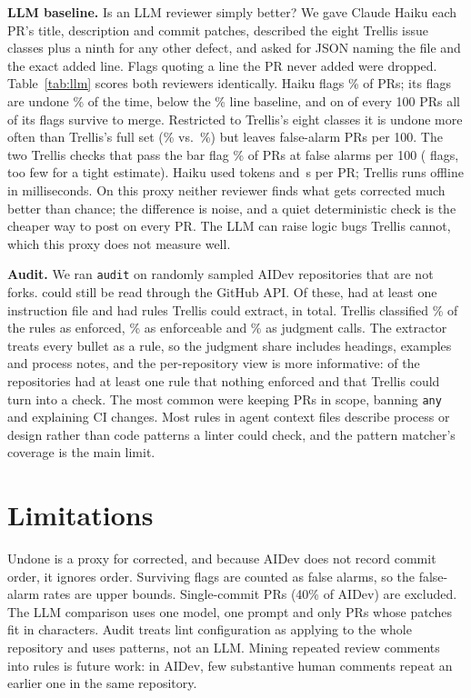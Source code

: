 \documentclass[sigconf]{acmart}
\begin{document}
\textbf{LLM baseline.} Is an LLM reviewer simply better? We gave Claude Haiku each PR's title, description and commit patches, described the eight Trellis issue classes plus a ninth for any other defect, and asked for JSON naming the file and the exact added line. Flags quoting a line the PR never added were dropped. Table~\ref{tab:llm} scores both reviewers identically. Haiku flags \lLlmAllPct\% of PRs; its flags are undone \lLlmAllUndone\% of the time, below the \lBase\% line baseline, and on \lLlmAllFa{} of every 100 PRs all of its flags survive to merge. Restricted to Trellis's eight classes it is undone more often than Trellis's full set (\lLlmSameUndone\% vs.\ \lTrAllUndone\%) but leaves \lLlmSameFa{} false-alarm PRs per 100. The two Trellis checks that pass the bar flag \lTrTwoPct\% of PRs at \lTrTwoFa{} false alarms per 100 (\lTrTwoN{} flags, too few for a tight estimate). Haiku used \lTokPerPR{} tokens and \lSec{}\,s per PR; Trellis runs offline in milliseconds. On this proxy neither reviewer finds what gets corrected much better than chance; the difference is noise, and a quiet deterministic check is the cheaper way to post on every PR. The LLM can raise logic bugs Trellis cannot, which this proxy does not measure well.

\textbf{Audit.} We ran \texttt{audit} on \aSampled{} randomly sampled AIDev repositories that are not forks. \aReachable{} could still be read through the GitHub API. Of these, \aWithInstructionFiles{} had at least one instruction file and \aWithRules{} had rules Trellis could extract, \aRules{} in total. Trellis classified \aEnforcedPct\% of the rules as enforced, \aEnforceablePct\% as enforceable and \aJudgmentPct\% as judgment calls. The extractor treats every bullet as a rule, so the judgment share includes headings, examples and process notes, and the per-repository view is more informative: \aReposWithUnenforcedCheckableRule{} of the \aWithRules{} repositories had at least one rule that nothing enforced and that Trellis could turn into a check. The most common were keeping PRs in scope, banning \texttt{any} and explaining CI changes. Most rules in agent context files describe process or design rather than code patterns a linter could check, and the pattern matcher's coverage is the main limit.

\section{Limitations}
Undone is a proxy for corrected, and because AIDev does not record commit order, it ignores order. Surviving flags are counted as false alarms, so the false-alarm rates are upper bounds. Single-commit PRs (40\% of AIDev) are excluded. The LLM comparison uses one model, one prompt and only PRs whose patches fit in \lMaxChars{} characters. Audit treats lint configuration as applying to the whole repository and uses patterns, not an LLM. Mining repeated review comments into rules is future work: in AIDev, few substantive human comments repeat an earlier one in the same repository.
\end{document}

